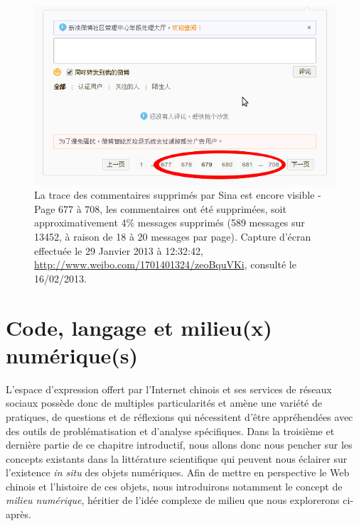 \begin{figure}[h]
    \centering
    \includegraphics[scale=0.5]{figures/chap1/comments.png}
    \caption[Commentaires supprimés par Sina]{La trace des commentaires supprimés par Sina est encore visible - Page 677 à 708, les commentaires ont été supprimées, soit approximativement 4\% messages supprimés (589 messages sur 13452, à raison de 18 à 20 messages par page). Capture d’écran effectuée le 29 Janvier 2013 à 12:32:42, \url{http://www.weibo.com/1701401324/zeoBquVKi}, consulté le 16/02/2013.}
    \label{fig:comments}
\end{figure}


\section[Code, langage et milieu(x) numérique(s)]{ Code, langage et milieu(x) numérique(s)}
L’espace d’expression offert par l’Internet chinois et ses services de réseaux sociaux possède donc de multiples particularités et amène une variété de pratiques, de questions et de réflexions qui nécessitent d’être appréhendées avec des outils de problématisation et d’analyse spécifiques. Dans la troisième et dernière partie de ce chapitre introductif, nous allons donc nous pencher sur les concepts existants dans la littérature scientifique qui peuvent nous éclairer sur l’existence \textit{in situ} des objets numériques. Afin de mettre en perspective le Web chinois et l’histoire de ces objets, nous introduirons notamment le concept de \textit{milieu numérique}, héritier de l’idée complexe de milieu que nous explorerons ci-après.

